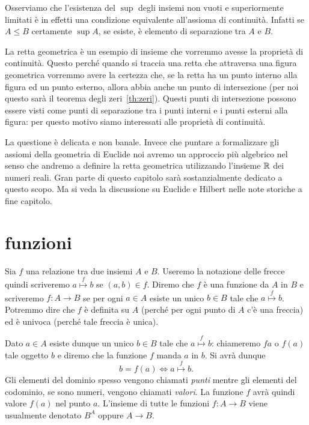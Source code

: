 Osserviamo che l'esistenza del $\sup$
degli insiemi non vuoti e superiormente limitati
è in effetti una condizione equivalente all'assioma di continuità.
Infatti se $A\le B$ certamente $\sup A$, se esiste, è elemento 
di separazione tra $A$ e $B$.

La retta geometrica è un esempio di insieme che 
vorremmo avesse la proprietà di continuità.
Questo perché quando si traccia una retta che attraversa una figura 
geometrica vorremmo avere la certezza che, 
se la retta ha un punto interno alla figura ed un punto esterno, 
allora abbia anche un punto di intersezione (per noi questo sarà il teorema 
degli zeri~\ref{th:zeri}).
Questi punti di intersezione possono essere  
visti come punti di separazione tra i punti
interni e i punti esterni alla figura:
per questo motivo siamo interessati alle proprietà di continuità.

La questione è delicata e non banale. 
Invece che puntare a formalizzare gli assiomi della geometria di Euclide
noi avremo un approccio più algebrico nel senso che andremo a definire 
la retta geometrica utilizzando l'insieme ${\mathbb R}$ dei numeri reali.
Gran parte di questo capitolo sarà sostanzialmente dedicato a questo scopo.
Ma si veda la discussione su Euclide e Hilbert nelle note storiche 
a fine capitolo.

\section{funzioni}

Sia $f$ una relazione tra due insiemi $A$ e $B$. 
Useremo la notazione delle frecce quindi scriveremo $a\stackrel f\mapsto b$ 
se $(a,b)\in f$. 
Diremo che $f$ è una funzione da $A$ in $B$ e scriveremo 
$f\colon A\to B$ se per ogni $a\in A$ esiste un unico $b\in B$ 
tale che $a \stackrel f \mapsto b$.
Potremmo dire che $f$ è definita su $A$ 
(perché per ogni punto di $A$ c'è una freccia)
ed è univoca (perché tale freccia è unica).

Dato $a\in A$ esiste dunque un unico $b\in B$ tale che
$a\stackrel f \mapsto b$: chiameremo $fa$
o $f(a)$ 
%
tale oggetto $b$
e diremo che la funzione $f$ manda $a$ in $b$. 
Si avrà dunque
\[
 b=f(a) \iff a\stackrel f \mapsto b.
\]
Gli elementi del dominio spesso vengono chiamati \emph{punti}
mentre gli elementi del codominio, se sono numeri, vengono 
chiamati \emph{valori}. 
La funzione $f$ avrà quindi valore $f(a)$ nel punto $a$.
L'insieme di tutte le funzioni $f\colon A\to B$ viene usualmente denotato $B^A$
oppure $A\to B$.
%
%
%
%

